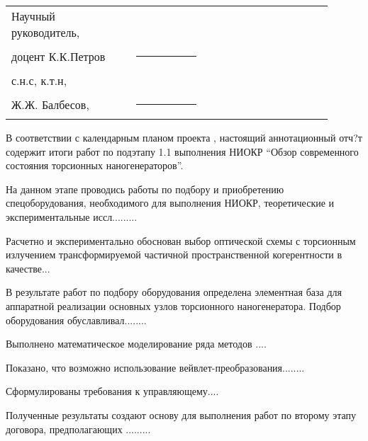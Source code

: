 \documentclass[utf8,usehyperref,12pt]{G7-32}
\begin{document}

\frontmatter %



\Executors %
\begin{longtable}{p{0.35\linewidth}p{0.2\linewidth}p{0.35\linewidth}}
Научный руководитель, 	&		&	\\
доцент К.К.Петров	&\rule{1\linewidth}{0.1pt}	&  \\ \vspace{1cm}

с.н.с, к.т.н,  &		&	\\
Ж.Ж. Балбесов, & \rule{1\linewidth}{0.1pt}& \\
\end{longtable}

\Referat %
В соответствии с календарным планом проекта \No, настоящий аннотационный отч?т содержит итоги работ по подэтапу 1.1 выполнения НИОКР ``Обзор современного состояния торсионных наногенераторов''.

На данном этапе проводись работы по подбору и приобретению спецоборудования, необходимого для выполнения НИОКР, теоретические и экспериментальные иссл.........

Расчетно и экспериментально обоснован выбор оптической схемы с торсионным излучением трансформируемой частичной пространственной когерентности в качестве...

В результате работ по подбору оборудования определена элементная база для аппаратной реализации основных узлов торсионного наногенератора. Подбор оборудования обуславливал........

Выполнено математическое моделирование ряда методов .... 

Показано, что возможно использование вейвлет-преобразования........

Сформулированы требования к управляющему....

Полученные результаты создают основу для выполнения работ по второму этапу договора, предполагающих .........

\tableofcontents
\end{document}
